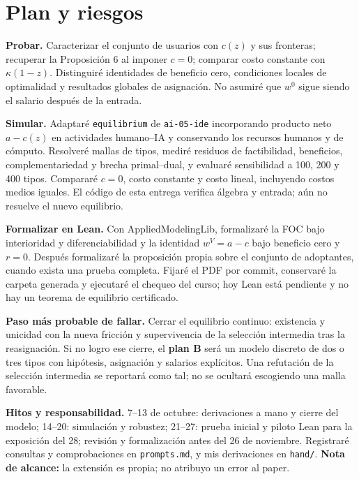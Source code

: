 \documentclass[11pt]{article}
\begin{document}
\section{Plan y riesgos}
\textbf{Probar.} Caracterizar el conjunto de usuarios con $c(z)$ y sus fronteras; recuperar la Proposición 6 al imponer $c=0$; comparar costo constante con $\kappa(1-z)$. Distinguiré identidades de beneficio cero, condiciones locales de optimalidad y resultados globales de asignación. No asumiré que $w^0$ sigue siendo el salario después de la entrada.

\textbf{Simular.} Adaptaré \texttt{equilibrium} de \texttt{ai-05-ide} incorporando producto neto $a-c(z)$ en actividades humano--IA y conservando los recursos humanos y de cómputo. Resolveré mallas de tipos, mediré residuos de factibilidad, beneficios, complementariedad y brecha primal--dual, y evaluaré sensibilidad a 100, 200 y 400 tipos. Compararé $c=0$, costo constante y costo lineal, incluyendo costos medios iguales. El código de esta entrega verifica álgebra y entrada; aún no resuelve el nuevo equilibrio.

\textbf{Formalizar en Lean.} Con AppliedModelingLib, formalizaré la FOC bajo interioridad y diferenciabilidad y la identidad $w^V=a-c$ bajo beneficio cero y $r=0$. Después formalizaré la proposición propia sobre el conjunto de adoptantes, cuando exista una prueba completa. Fijaré el PDF por commit, conservaré la carpeta generada y ejecutaré el chequeo del curso; hoy Lean está pendiente y no hay un teorema de equilibrio certificado.

\textbf{Paso más probable de fallar.} Cerrar el equilibrio continuo: existencia y unicidad con la nueva fricción y supervivencia de la selección intermedia tras la reasignación. Si no logro ese cierre, el \textbf{plan B} será un modelo discreto de dos o tres tipos con hipótesis, asignación y salarios explícitos. Una refutación de la selección intermedia se reportará como tal; no se ocultará escogiendo una malla favorable.

\textbf{Hitos y responsabilidad.} 7--13 de octubre: derivaciones a mano y cierre del modelo; 14--20: simulación y robustez; 21--27: prueba inicial y piloto Lean para la exposición del 28; revisión y formalización antes del 26 de noviembre. Registraré consultas y comprobaciones en \texttt{prompts.md}, y mis derivaciones en \texttt{hand/}. \textbf{Nota de alcance:} la extensión es propia; no atribuyo un error al paper.
\begingroup\small\setlength{\bibsep}{3pt}

\endgroup
\end{document}
